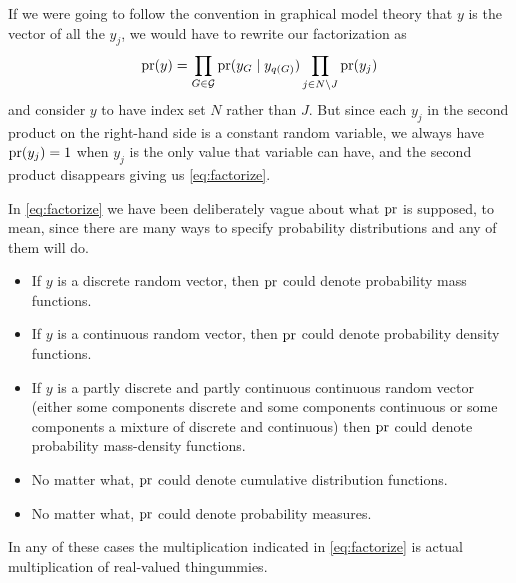 If we were going to follow the convention in graphical model theory that
$y$ is the vector of all the $y_j$, we would have to rewrite our factorization
as
$$
   \operatorname{pr}(y) = \prod_{G \in \mathcal{G}} \operatorname{pr}(y_G \mid y_{q(G)})
   \prod_{j \in N \setminus J} \operatorname{pr}(y_j)
$$
and consider $y$ to have index set $N$ rather than $J$.
But since each $y_j$ in the second product on the right-hand side is
a constant random variable, we always have $\operatorname{pr}(y_j) = 1$ when $y_j$
is the only value that variable can have,
and the second product disappears giving us \eqref{eq:factorize}.

In \eqref{eq:factorize} we have been deliberately vague about what $\operatorname{pr}$ is
supposed, to mean, since there are many ways to specify probability
distributions and any of them will do.
\begin{itemize}
\item If $y$ is a discrete random vector,
      then $\operatorname{pr}$ could denote probability mass functions.
\item If $y$ is a continuous random vector,
      then $\operatorname{pr}$ could denote probability density functions.
\item If $y$ is a partly discrete and partly continuous continuous
      random vector (either some components discrete and some components
      continuous or some components a mixture of discrete and continuous)
      then $\operatorname{pr}$ could denote probability mass-density functions.
\item No matter what, $\operatorname{pr}$ could denote cumulative distribution functions.
\item No matter what, $\operatorname{pr}$ could denote probability measures.
\end{itemize}
In any of these cases the multiplication indicated in \eqref{eq:factorize}
is actual multiplication of real-valued thingummies.

